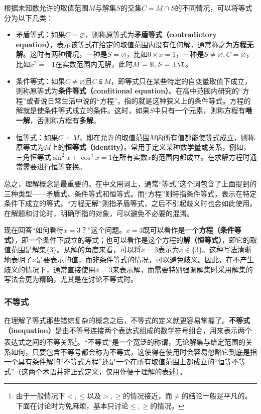 根据未知数允许的取值范围$M$与解集$S$的交集$C=M\cap S$的不同情况，可以将等式分为以下几类：
\begin{itemize}
\item 矛盾等式：如果$C = \varnothing$，则称原等式为\textbf{矛盾等式（contradictory equation）}，表示该等式在给定的取值范围内没有任何解，通常称之为\textbf{方程无解}。这时有两种情况，一种是$S=\varnothing$，比如$0\times x=1$，一种是$S\neq\varnothing,C=\varnothing$，比如$x^2=-1$在实数范围内无解，此时$M=\mathbb{R},S={\pm \I}$。
\item 条件等式：如果$C \neq \varnothing$且$C \subsetneqq M$，即等式只在某些特定的自变量取值下成立，则称原等式为\textbf{条件等式（conditional equation）}。在高中范围内研究的“方程”或者说日常生活中说的“方程”，指的就是这种狭义上的条件等式。方程的解就是使条件等式成立的条件。这时，如果$S$中只有一个元素，则称方程有\textbf{唯一解}，否则称方程有\textbf{多解}。
\item 恒等式：如果$C = M$，即在允许的取值范围$M$内所有值都能使等式成立，则称原等式为$M$上的\textbf{恒等式（identity）}。常用于定义某种数学量或关系，例如，三角恒等式$\sin^2 x + \cos^2 x = 1$在所有实数$x$的范围内都成立。在求解方程时通常需要进行恒等变换。
\end{itemize}

总之，理解概念是最重要的。在中文用词上，通常“等式”这个词包含了上面提到的三种类型——矛盾式、条件等式和恒等式。而“方程”则特指条件等式，表示在特定条件下成立的等式，“方程无解”则指矛盾等式，之后不引起歧义时也会如此使用。在解题和讨论时，明确所指的对象，可以避免不必要的混淆。

现在回答“如何看待$x = 3$？”这个问题。$x = 3$既可以看作是一个\textbf{方程（条件等式）}，即一个条件下成立的等式；也可以看作是这个方程的\textbf{解（恒等式）}，即它的取值范围是解集$\{3\}$。从解的角度来看，可以将$x = 3$表示为$x \in \{3\}$。这种写法清晰地表明了$x$是要表示的值，而非条件等式的情况，可以避免歧义。因此，在不产生歧义的情况下，通常直接使用$x = 3$来表示解，而需要特别强调解集时采用解集的写法会更为精确，尤其是在讨论不等式时。

\subsubsection{不等式}

在理解了等式那些错综复杂的概念之后，不等式的定义就更容易掌握了。\textbf{不等式（inequation）}是由不等号连接两个表达式组成的数学符号组合，用来表示两个表达式之间的不等关系\footnote{由于一般情况下$<,\leq$以及$>,\geq$的情况接近，而$\neq$的结论一般是平凡的。下面在讨论时为免麻烦，基本只讨论$\leq,\geq$的情况。}。“不等式”是一个宽泛的称谓，无论解集与给定范围的关系如何，只要包含不等号都会称为不等式，这使得在使用时会容易忽略它到底是指一个具有条件解的“不等式方程”还是一个在所有取值范围上都成立的“恒等不等式”（这两个术语并非正式定义，仅用作便于理解的表述）。

